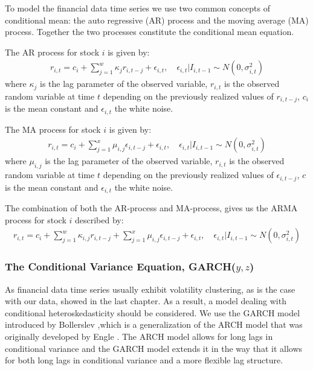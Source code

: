 To model the financial data time series we use two common concepts of conditional mean: the auto regressive (AR) process and the moving average (MA) process. Together the two processes constitute the conditional mean equation. 

The AR process for stock $i$ is given by:
\begin{align}
    r_{i,t}=c_i + \sum_{j=1}^w\kappa_j r_{i,t-j} + \epsilon_{i,t},\quad \epsilon_{i,t} | I_{i,t-1} \sim N(0,{\sigma_{i,t}^2}) \label{ConditionalMeanEquation}
\end{align}
where $\kappa_j$ is the lag parameter of the observed variable, $r_{i,t}$ is the observed random variable at time $t$ depending on the previously realized values of $r_{i, t-j}$, $c_i$ is the mean constant and $\epsilon_{i,t}$ the white noise.

The MA process for stock $i$ is given by:
\begin{align}
    r_{i,t}=c_i + \sum_{j=1}^x\mu_{i,j} \epsilon_{i,t-j} + \epsilon_{i,t},\quad \epsilon_{i,t} | I_{i,t-1} \sim N(0,{\sigma_{i,t}^2}) \label{ConditionalMeanEquation}
\end{align}
where $\mu_{i,j}$ is the lag parameter of the observed variable, $r_{i,t}$ is the observed random variable at time $t$ depending on the previously realized values of $\epsilon_{i,t-j}$, $c$ is the mean constant and $\epsilon_{i,t}$ the white noise.

The combination of both the AR-process and MA-process, gives us the ARMA process for stock $i$ described by:
\begin{align}
    r_{i,t}=c_i+\sum_{j=1}^w\kappa_{i,j} r_{i,t-j}+\sum_{j=1}^x\mu_{i,j} \epsilon_{i,t-j}+\epsilon_{i,t},\quad \epsilon_{i,t} | I_{i,t-1} \sim N(0,{\sigma_{i,t}^2}) \label{ConditionalMeanEquation}
\end{align}

\subsubsection{The Conditional Variance Equation, GARCH($y,z$)}
As financial data time series usually exhibit volatility clustering, as is the case with our data, showed in the last chapter. As a result, a model dealing with conditional heteroskedasticity should be considered. We use the GARCH model introduced by Bollerslev \cite{Bollerslev},which is a generalization of the ARCH model that was originally developed by Engle \cite{Engel}. The ARCH model allows for long lags in conditional variance and the GARCH model extends it in the way that it allows for both long lags in conditional variance and a more flexible lag structure.

